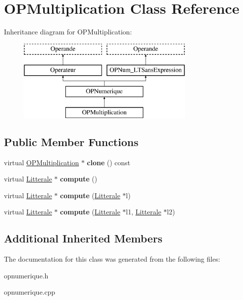 \hypertarget{class_o_p_multiplication}{}\section{O\+P\+Multiplication Class Reference}
\label{class_o_p_multiplication}
Inheritance diagram for O\+P\+Multiplication\+:\begin{figure}[H]
\begin{center}
\leavevmode
\includegraphics[height=4.000000cm]{class_o_p_multiplication}
\end{center}
\end{figure}
\subsection*{Public Member Functions}
\begin{DoxyCompactItemize}
\item 
virtual \hyperlink{class_o_p_multiplication}{O\+P\+Multiplication} $\ast$ {\bfseries clone} () const \hypertarget{class_o_p_multiplication_a66480e4938363d21b1e4a97fd3bf567a}{}\label{class_o_p_multiplication_a66480e4938363d21b1e4a97fd3bf567a}

\item 
virtual \hyperlink{class_litterale}{Litterale} $\ast$ {\bfseries compute} ()\hypertarget{class_o_p_multiplication_a7d003b8266223388ae42d7bd97743026}{}\label{class_o_p_multiplication_a7d003b8266223388ae42d7bd97743026}

\item 
virtual \hyperlink{class_litterale}{Litterale} $\ast$ {\bfseries compute} (\hyperlink{class_litterale}{Litterale} $\ast$l)\hypertarget{class_o_p_multiplication_a0df1aa4bb76cd4171a8796d330f4ed19}{}\label{class_o_p_multiplication_a0df1aa4bb76cd4171a8796d330f4ed19}

\item 
virtual \hyperlink{class_litterale}{Litterale} $\ast$ {\bfseries compute} (\hyperlink{class_litterale}{Litterale} $\ast$l1, \hyperlink{class_litterale}{Litterale} $\ast$l2)\hypertarget{class_o_p_multiplication_a7fbe82d1301bac177fa893d754beeb22}{}\label{class_o_p_multiplication_a7fbe82d1301bac177fa893d754beeb22}

\end{DoxyCompactItemize}
\subsection*{Additional Inherited Members}


The documentation for this class was generated from the following files\+:\begin{DoxyCompactItemize}
\item 
opnumerique.\+h\item 
opnumerique.\+cpp\end{DoxyCompactItemize}
